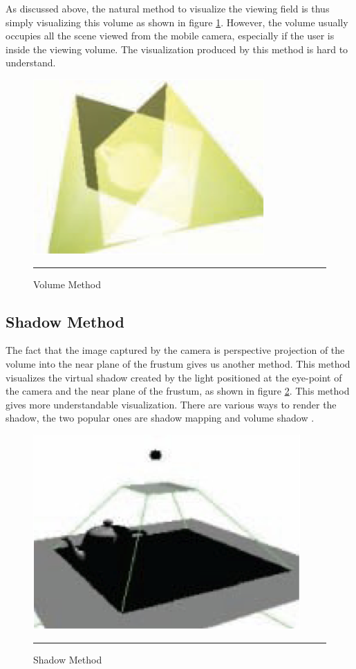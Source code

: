 As discussed above, the natural method to visualize the viewing field is thus simply visualizing this volume as shown in figure \ref{fig:VolumeMethod}. However, the volume usually occupies all the scene viewed from the mobile camera, especially if the user is inside the viewing volume. The visualization produced by this method is hard to understand.

\begin{figure}[htbp]
	\centering
	\includegraphics{./Primitives/theory_volume.png}
	\rule{35em}{0.5pt}
	\caption[Volume Method]{Volume Method}
	\label{fig:VolumeMethod}
\end{figure}

\subsection{Shadow Method}

The fact that the image captured by the camera is perspective projection of the volume into the near plane of the frustum gives us another method. This method visualizes the virtual shadow created by the light positioned at the eye-point of the camera and the near plane of the frustum, as shown in figure \ref{fig:ShadowMethod}. This method gives more understandable visualization. There are various ways to render the shadow, the two popular ones are shadow mapping \citep{Reference7} \citep{Reference8} and volume shadow \citep{Reference9}.

\begin{figure}[htbp]
	\centering
	\includegraphics{./Primitives/theory_shadow.png}
	\rule{35em}{0.5pt}
	\caption[Volume Method]{Shadow Method}
	\label{fig:ShadowMethod}
\end{figure}

